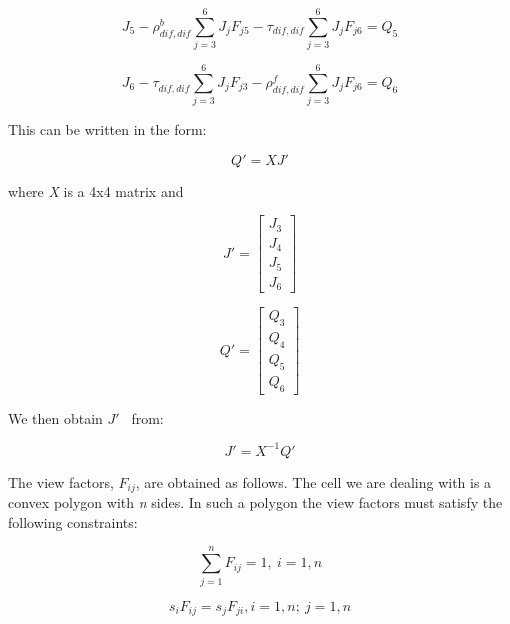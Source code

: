 \begin{equation}
{J_5} - \rho_{dif,dif}^b\sum\limits_{j = 3}^6 {{J_j}{F_{j5}} - {\tau_{dif,dif}}\sum\limits_{j = 3}^6 {{J_j}{F_{j6}} = {Q_5}} }
\end{equation}

\begin{equation}
{J_6} - \tau_{dif,dif}^{}\sum\limits_{j = 3}^6 {{J_j}{F_{j3}} - \rho_{dif,dif}^f\sum\limits_{j = 3}^6 {{J_j}{F_{j6}} = {Q_6}} }
\end{equation}

This can be written in the form:

\begin{equation}
Q' = XJ'
\label{eq:QequalsXJprime}
\end{equation}

where \emph{X} is a 4x4 matrix and

\begin{equation}
J' = \left[ \begin{array}{c}
   J_3 \\
   J_4 \\
   J_5 \\
   J_6 \end{array} \right]
\end{equation}

\begin{equation}
Q' = \left[ \begin{array}{c}
    Q_3 \\
    Q_4 \\
    Q_5 \\
    Q_6 \end{array} \right]
\end{equation}

We then obtain \(J'\) ~from:

\begin{equation}
J' = {X^{ - 1}}Q'
\end{equation}

The view factors, \({F_{ij}}\), are obtained as follows. The cell we are dealing with is a convex polygon with \emph{n} sides. In such a polygon the view factors must satisfy the following constraints:

\begin{equation}
\sum\limits_{j = 1}^n {{F_{ij}} = 1{\mathrm{,  }}~i = 1,n}
\end{equation}

\begin{equation}
{s_i}{F_{ij}} = {s_j}{F_{ji}}{\mathrm{,  }}i = 1,n{\mathrm{;  }}~j = 1,n
\end{equation}

